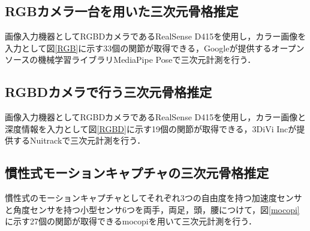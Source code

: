 \documentclass[titlepage]{jarticle}
\begin{document}
\subsection{RGBカメラ一台を用いた三次元骨格推定}\label{RGB_sec}
%
%
画像入力機器としてRGBDカメラであるRealSense D415を使用し，カラー画像を入力として図\ref{RGB}に示す33個の関節が取得できる，Googleが提供するオープンソースの機械学習ライブラリMediaPipe Poseで三次元計測を行う．
\subsection{RGBDカメラで行う三次元骨格推定}\label{RGBD_sec}
%
画像入力機器としてRGBDカメラであるRealSense D415を使用し，カラー画像と深度情報を入力として図\ref{RGBD}に示す19個の関節が取得できる，3DiVi Incが提供するNuitrackで三次元計測を行う．
\subsection{慣性式モーションキャプチャの三次元骨格推定}
%
慣性式のモーションキャプチャとしてそれぞれ3つの自由度を持つ加速度センサと角度センサを持つ小型センサ6つを両手，両足，頭，腰につけて，図\ref{mocopi}に示す27個の関節が取得できるmocopiを用いて三次元計測を行う．
\end{document}
